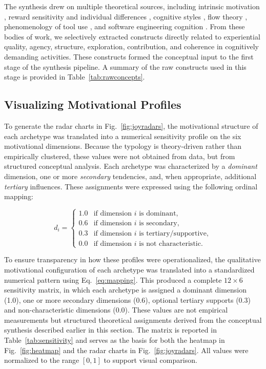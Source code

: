 \documentclass[12pt]{elsarticle}
\begin{document}
\smallskip
The synthesis drew on multiple theoretical sources, including intrinsic
motivation \cite{ryan2000selfdetermination}, reward sensitivity and individual
differences \cite{gray1987personality}, cognitive styles
\cite{messick1976personality}, flow theory \cite{csikszentmihalyi1990flow},
phenomenology of tool use \cite{heidegger1996being,ihde1990technology}, and
software engineering cognition \cite{parnin2011programmer}.
From these bodies of work, we selectively extracted constructs directly related
to experiential quality, agency, structure, exploration, contribution, and
coherence in cognitively demanding activities. These constructs formed the
conceptual input to the first stage of the synthesis pipeline. A summary of the
raw constructs used in this stage is provided in Table~\ref{tab:rawconcepts}.


\subsection{Visualizing Motivational Profiles}
\label{sec:profiles}

To generate the radar charts in Fig.~\ref{fig:joyradars}, the 
motivational structure of each archetype was translated into a numerical sensitivity profile on 
the six motivational dimensions. Because the typology is theory-driven 
rather than empirically clustered, these values were not obtained from data, but 
from structured conceptual analysis. Each archetype was characterized by a 
\emph{dominant} dimension, one or more \emph{secondary} tendencies, and, when 
appropriate, additional \emph{tertiary} influences. These assignments were 
expressed using the following ordinal mapping:

\begin{equation}
d_i =
\begin{cases}
1.0 & \text{if dimension } i \text{ is dominant},\\[4pt]
0.6 & \text{if dimension } i \text{ is secondary},\\[4pt]
0.3 & \text{if dimension } i \text{ is tertiary/supportive},\\[4pt]
0.0 & \text{if dimension } i \text{ is not characteristic}.
\end{cases}
\label{eq:mapping}
\end{equation}

To ensure transparency in how these profiles were operationalized, the 
qualitative motivational configuration of each archetype was translated into a 
standardized numerical pattern using Eq.~\ref{eq:mapping}. This produced a 
complete $12 \times 6$ sensitivity matrix, in which each archetype is assigned a 
dominant dimension (1.0), one or more secondary dimensions (0.6), optional 
tertiary supports (0.3) and non-characteristic dimensions (0.0). These values 
are not empirical measurements but structured theoretical assignments derived 
from the conceptual synthesis described earlier in this section. The matrix is 
reported in Table~\ref{tab:sensitivity} and serves as the basis for both the 
heatmap in Fig.~\ref{fig:heatmap} and the radar charts in 
Fig.~\ref{fig:joyradars}. All values were normalized to the range $[0,1]$ to 
support visual comparison.
\end{document}
